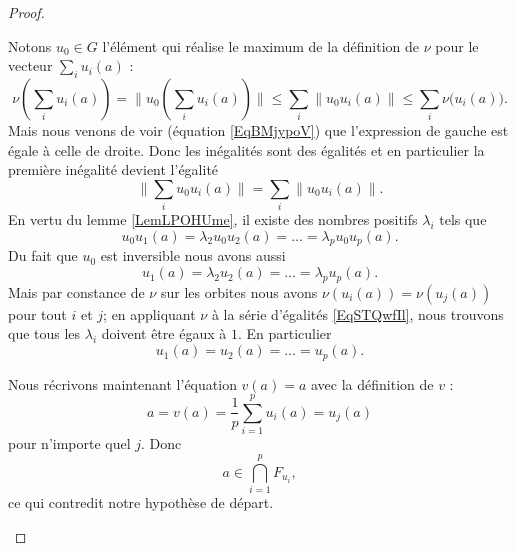 \begin{proof}
\begin{subproof}
        Notons \( u_0\in G\) l'élément qui réalise le maximum de la définition de \( \nu\) pour le vecteur \( \sum_iu_i(a)\) :
        \begin{equation}
            \nu\left( \sum_i u_i(a) \right)=\| u_0\left( \sum_iu_i(a) \right) \|\leq\sum_i\| u_0u_i(a) \|\leq \sum_i\nu\big( u_i(a) \big).
        \end{equation}
        Mais nous venons de voir (équation \eqref{EqBMjypoV}) que l'expression de gauche est égale à celle de droite. Donc les inégalités sont des égalités et en particulier la première inégalité devient l'égalité
        \begin{equation}
            \| \sum_iu_0u_i(a)  \|=\sum_i\| u_0u_i(a) \|.
        \end{equation}
        En vertu du lemme \ref{LemLPOHUme}, il existe des nombres positifs \( \lambda_i\) tels que
        \begin{equation}
            u_0u_1(a)=\lambda_2u_0u_2(a)=\ldots =\lambda_pu_0u_p(a).
        \end{equation}
        Du fait que \( u_0\) est inversible nous avons aussi 
        \begin{equation}       \label{EqSTQwfIl}
            u_1(a)=\lambda_2u_2(a)=\ldots =\lambda_pu_p(a).
        \end{equation}
        Mais par constance de \( \nu\) sur les orbites nous avons \( \nu(u_i(a))=\nu(u_j(a))\) pour tout \( i\) et \( j\); en appliquant \( \nu\) à la série d'égalités \eqref{EqSTQwfIl}, nous trouvons que tous les \( \lambda_i\) doivent être égaux à \( 1\). En particulier
        \begin{equation}     
            u_1(a)=u_2(a)=\ldots =u_p(a).
        \end{equation}
        
        Nous récrivons maintenant l'équation \( v(a)=a\) avec la définition de \( v\) :
        \begin{equation}
            a=v(a)=\frac{1}{ p }\sum_{i=1}^pu_i(a)=u_j(a)
        \end{equation}
        pour n'importe quel \( j\). Donc
        \begin{equation}
            a\in\bigcap_{i=1}^pF_{u_i},
        \end{equation}
        ce qui contredit notre hypothèse de départ.
        \end{subproof}
\end{proof}

